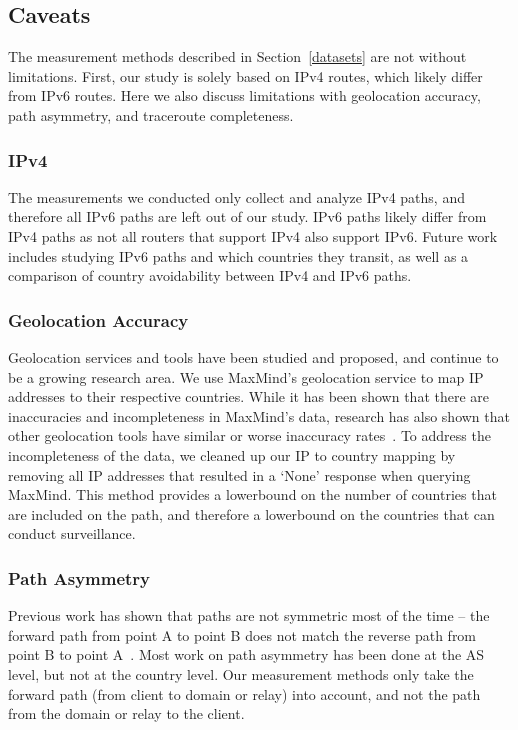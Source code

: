 \subsection{Caveats}
The measurement methods described in Section~\ref{datasets} are not without limitations.  First, our study is solely based on IPv4 routes, which likely differ from IPv6 routes.  Here we also discuss limitations with geolocation accuracy, path asymmetry, and traceroute completeness.

\subsubsection{IPv4}
The measurements we conducted only collect and analyze IPv4 paths, and therefore all IPv6 paths are left out of our study.  IPv6 paths likely differ from IPv4 paths as not all routers that support IPv4 also support IPv6.  Future work includes studying IPv6 paths and which countries they transit, as well as a comparison of country avoidability between IPv4 and IPv6 paths. 

\subsubsection{Geolocation Accuracy}
Geolocation services and tools have been studied and proposed, and continue to be a growing research area.  We use MaxMind's geolocation service to map IP addresses to their respective countries.  While it has been shown that there are inaccuracies and incompleteness in MaxMind's data, research has also shown that other geolocation tools have similar or worse inaccuracy rates~\cite{huffaker2011geocompare}.  To address the incompleteness of the data, we cleaned up our IP to country mapping by removing all IP addresses that resulted in a `None' response when querying MaxMind.  This method provides a lowerbound on the number of countries that are included on the path, and therefore a lowerbound on the countries that can conduct surveillance.  

\subsubsection{Path Asymmetry}
Previous work has shown that paths are not symmetric most of the time -- the forward path from point A to point B does not match the reverse path from point B to point A~\cite{he2005routing}.  Most work on path asymmetry has been done at the AS level, but not at the country level.  Our measurement methods only take the forward path (from client to domain or relay) into account, and not the path from the domain or relay to the client.  

